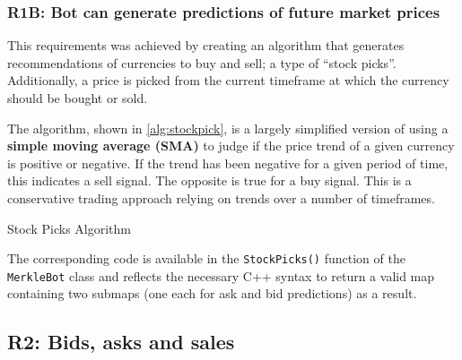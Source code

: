 \subsubsection{R1B: Bot can generate predictions of future market prices}

This requirements was achieved by creating an algorithm that generates recommendations of currencies to buy and sell; a type of ``stock picks''. Additionally, a price is picked from the current timeframe at which the currency should be bought or sold.

The algorithm, shown in \autoref{alg:stockpick}, is a largely simplified version of using a \textbf{simple moving average (SMA)} to judge if the price trend of a given currency is positive or negative. If the trend has been negative for a given period of time, this indicates a sell signal. The opposite is true for a buy signal. This is a conservative trading approach relying on trends over a number of timeframes.

\begin{algorithm}[H]
	\caption{Stock Picks Algorithm}
	\begin{algorithmic}
\EndIf{}
\EndIf{}
\EndFor{}
\EndFunction{}

	\end{algorithmic}
\label{alg:stockpick}
\end{algorithm}

The corresponding code is available in the \texttt{StockPicks()} function of the \texttt{MerkleBot} class and reflects the necessary C++ syntax to return a valid map containing two submaps (one each for ask and bid predictions) as a result.

\subsection{R2: Bids, asks and sales}
